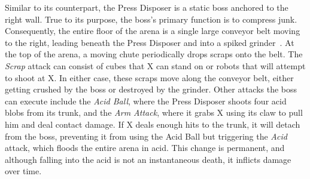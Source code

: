 Similar to its counterpart, the Press Disposer is a static boss anchored to the right wall. True to its purpose, the boss's primary function is to compress junk. Consequently, the entire floor of the arena is a single large conveyor belt moving to the right, leading beneath the Press Disposer and into a spiked grinder~\cite{wiki:Press_disposer}. At the top of the arena, a moving chute periodically drops scraps onto the belt. The \emph{Scrap} attack can consist of cubes that X can stand on or robots that will attempt to shoot at X. In either case, these scraps move along the conveyor belt, either getting crushed by the boss or destroyed by the grinder. Other attacks the boss can execute include the \emph{Acid Ball}, where the Press Disposer shoots four acid blobs from its trunk, and the \emph{Arm Attack}, where it grabs X using its claw to pull him and deal contact damage. If X deals enough hits to the trunk, it will detach from the boss, preventing it from using the Acid Ball but triggering the \emph{Acid} attack, which floods the entire arena in acid. This change is permanent, and although falling into the acid is not an instantaneous death, it inflicts damage over time.

